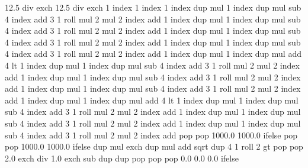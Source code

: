 {\pgfpoint{-50bp}{-50bp}}
{\pgfpoint{50bp}{50bp}}{}
{
  12.5 div exch 12.5 div exch
  1 index 1 index
  1 index dup mul %
  1 index dup mul %
  sub             %
  4 index add     %
  3 1 roll
  mul 2 mul       %
  2 index add     %
  1 index dup mul %
  1 index dup mul %
  sub             %
  4 index add     %
  3 1 roll
  mul 2 mul       %
  2 index add     %
  1 index dup mul %
  1 index dup mul %
  sub             %
  4 index add     %
  3 1 roll
  mul 2 mul       %
  2 index add     %
  1 index dup mul %
  1 index dup mul %
  sub             %
  4 index add     %
  3 1 roll
  mul 2 mul       %
  2 index add     %
  1 index dup mul 1 index dup mul add
  4 lt {
  1 index dup mul %
  1 index dup mul %
  sub             %
  4 index add     %
  3 1 roll
  mul 2 mul       %
  2 index add     %
  1 index dup mul %
  1 index dup mul %
  sub             %
  4 index add     %
  3 1 roll
  mul 2 mul       %
  2 index add     %
  1 index dup mul %
  1 index dup mul %
  sub             %
  4 index add     %
  3 1 roll
  mul 2 mul       %
  2 index add     %
  1 index dup mul 1 index dup mul add
  4 lt {
  1 index dup mul %
  1 index dup mul %
  sub             %
  4 index add     %
  3 1 roll
  mul 2 mul       %
  2 index add     %
  1 index dup mul %
  1 index dup mul %
  sub             %
  4 index add     %
  3 1 roll
  mul 2 mul       %
  2 index add     %
  1 index dup mul %
  1 index dup mul %
  sub             %
  4 index add     %
  3 1 roll
  mul 2 mul       %
  2 index add     %
  } { pop pop 1000.0 1000.0 } ifelse
  } { pop pop 1000.0 1000.0 } ifelse
  dup mul exch
  dup mul
  add sqrt
  dup 4 1 roll
  2 gt { pop pop 2.0 exch div 1.0 exch sub dup dup} {pop pop pop 0.0 0.0 0.0} ifelse
  \ifpgfshadingmodelcmyk
    \pgffuncshadingrgbtocmyk
  \fi
  \ifpgfshadingmodelgray
    \pgffuncshadingrgbtogray
  \fi
}%
